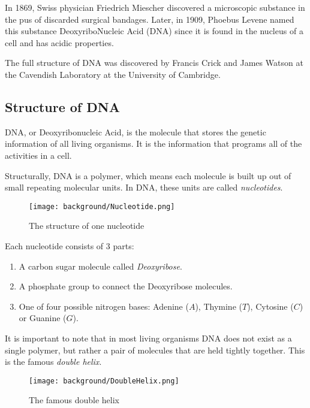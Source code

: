 In 1869, Swiss physician Friedrich Miescher discovered a microscopic substance in the pus of discarded surgical bandages. Later, in 1909, Phoebus Levene named this substance DeoxyriboNucleic Acid (DNA) since it is found in the nucleus of a cell and has acidic properties.

The full structure of DNA was discovered by Francis Crick and James Watson at the Cavendish Laboratory at the University of Cambridge.

\subsection{Structure of DNA}

DNA, or Deoxyribonucleic Acid, is the molecule that stores the genetic information of all living organisms. It is the information that programs all of the activities in a cell.

Structurally, DNA is a polymer, which means each molecule is built up out of small repeating molecular units. In DNA, these units are called \emph{nucleotides}.

\begin{figure}[H]
	\centering
	\texttt{[image: background/Nucleotide.png]}
	\caption{The structure of one nucleotide}
	\label{fig:nucleotide}
\end{figure}

Each nucleotide consists of 3 parts:

\begin{enumerate}
	\item A carbon sugar molecule called \emph{Deoxyribose}.
	\item A phosphate group to connect the Deoxyribose molecules. 
	\item One of four possible nitrogen bases: Adenine ($A$), Thymine ($T$), Cytosine ($C$) or Guanine ($G$).
\end{enumerate}

It is important to note that in most living organisms DNA does not exist as a single polymer, but rather a pair of molecules that are held tightly together. This is the famous \emph{double helix}.

\begin{figure}[H]
	\centering
	\texttt{[image: background/DoubleHelix.png]}
	\caption{The famous double helix}
	\label{fig:doubleHelix}
\end{figure}

